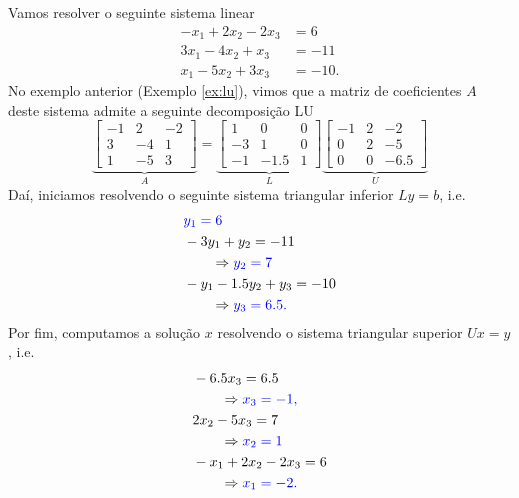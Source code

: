 \begin{ex}\label{ex:lu}
  Vamos resolver o seguinte sistema linear
  \begin{equation}
    \begin{aligned}
      -x_1 + 2x_2 - 2x_3 &= 6\\
      3x_1 - 4x_2 + x_3 &= -11\\
      x_1 - 5x_2 + 3x_3 &= -10.
    \end{aligned}
\end{equation}
  No exemplo anterior (Exemplo \ref{ex:lu}), vimos que a matriz de coeficientes $A$ deste sistema admite a seguinte decomposição LU
  \begin{equation}
    \underbrace{\begin{bmatrix}
      -1 & 2 & -2\\
      3 & -4 & 1\\
      1 & -5 & 3
    \end{bmatrix}}_{A} =
  \underbrace{\begin{bmatrix}
      1 & 0 & 0\\
      -3 & 1 & 0\\
      -1 & -1.5 & 1
    \end{bmatrix}}_{L}
  \underbrace{\begin{bmatrix}
      -1 & 2 & -2\\
      0 & 2 & -5\\
      0 & 0 & -6.5
    \end{bmatrix}}_{U}
  \end{equation}
  Daí, iniciamos resolvendo o seguinte sistema triangular inferior $Ly = b$, i.e.
  \begin{align}
    &\color{blue}y_1 = 6 \\
    &-3y_1 + y_2 = -11 \\
    &\qquad\Rightarrow \color{blue}y_2 = 7\\
    &-y_1 - 1.5y_2 + y_3 = -10 \\
    &\qquad\Rightarrow \color{blue}y_3 = 6.5.
  \end{align}
  Por fim, computamos a solução $x$ resolvendo o sistema triangular superior $Ux=y$, i.e.
  \begin{align}
    &-6.5x_3 = 6.5 \\
    &\qquad \Rightarrow \color{blue}x_3 = -1,\\
    &2x_2 - 5x_3 = 7 \\
    &\qquad \Rightarrow \color{blue}x_2 = 1\\
    &-x_1 + 2x_2 - 2x_3 = 6 \\
    &\qquad \Rightarrow \color{blue}x_1 = -2.
  \end{align}


\end{ex}
